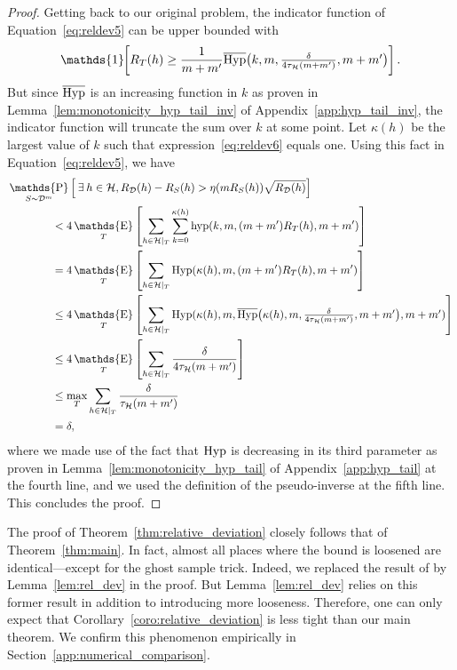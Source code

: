 \documentclass[twoside,11pt]{article}
\newcommand{\Id}[1]{\mathds{1}\hspace{-2.5pt}\left[#1\right]}
\let\oldexists=\exists
\renewcommand{\exists}{\hspace{1pt}\oldexists\hspace{1pt}}
\newcommand{\D}{\mathcal{D}}
\renewcommand{\H}{{\mathcal{H}}}
\DeclareMathOperator*{\Prob}{\mathds{P}}
\newcommand{\prob}[2]{\Prob_{#1}\left[#2\right]}
\DeclareMathOperator*{\Expectation}{\mathds{E}}
\newcommand{\exv}[2]{\Expectation_{#1}\left[#2\right]}
\newcommand{\hyp}{\textnormal{hyp}}
\newcommand{\Hyp}{\textnormal{Hyp}}
\newcommand{\HypInv}{\overline{\textnormal{Hyp}}}
\begin{document}
\begin{proof}
Getting back to our original problem, the indicator function of Equation~\eqref{eq:reldev5} can be upper bounded with
\begin{equation}
    \Id{R_{T}(h)\ge \frac{1}{m+m'}\HypInv\big(k, m, \textstyle\frac{\delta}{4 \tau_\H(m + m')}, m + m'\big) }.\label{eq:reldev6}
\end{equation}
But since $\HypInv$ is an increasing function in $k$ as proven in Lemma~\ref{lem:monotonicity_hyp_tail_inv} of Appendix~\ref{app:hyp_tail_inv}, the indicator function will truncate the sum over $k$ at some point.
Let $\kappa(h)$ be the largest value of $k$ such that expression~\eqref{eq:reldev6} equals one.
Using this fact in Equation~\eqref{eq:reldev5}, we have 
\begin{align*}
&\prob{S\sim\D^m}{\exists h \in \H, R_\D(h) - R_S(h) > \eta(m R_S(h)) \sqrt{R_\D(h)}}\\
    &\hspace{40pt} < 4 \exv{T}{\sum_{h\in\H|_T} \sum_{k=0}^{\kappa(h)} \hyp(k,m,(m+m')R_T(h),m+m') }\\
    &\hspace{40pt} = 4 \exv{T}{\sum_{h\in\H|_T} \Hyp(\kappa(h),m,(m+m')R_T(h),m+m') }\\
    &\hspace{40pt} \le 4 \exv{T}{\sum_{h\in\H|_T} \Hyp(\kappa(h),m,\HypInv\big(\kappa(h), m, \textstyle\frac{\delta}{4 \tau_\H(m + m')}, m + m'\big),m+m') }\\
    &\hspace{40pt} \le 4 \exv{T}{\sum_{h\in\H|_T} \frac{\delta}{4 \tau_\H(m + m')} }\\
    &\hspace{40pt} \le \max_T \sum_{h\in\H|_T} \frac{\delta}{\tau_\H(m + m')}\\
    &\hspace{40pt} = \delta,
\end{align*}
where we made use of the fact that $\Hyp$ is decreasing in its third parameter as proven in Lemma~\ref{lem:monotonicity_hyp_tail} of Appendix~\ref{app:hyp_tail} at the fourth line, and we used the definition of the pseudo-inverse at the fifth line.
This concludes the proof.
\end{proof}

The proof of Theorem~\ref{thm:relative_deviation} closely follows that of Theorem~\ref{thm:main}.
In fact, almost all places where the bound is loosened are identical---except for the ghost sample trick.
Indeed, we replaced the result of \cite{greenberg14} by Lemma~\ref{lem:rel_dev} in the proof.
But Lemma~\ref{lem:rel_dev} relies on this former result in addition to introducing more looseness.
Therefore, one can only expect that Corollary~\ref{coro:relative_deviation} is less tight than our main theorem.
We confirm this phenomenon empirically in Section~\ref{app:numerical_comparison}.
\end{document}
